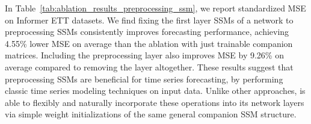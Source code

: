 In Table~\ref{tab:ablation_results_preprocessing_ssm}, we report standardized MSE on Informer ETT datasets. We find fixing the first layer SSMs of a \ourmethod{} network to preprocessing SSMs consistently improves forecasting performance, achieving 4.55\% lower MSE on average than the ablation with just trainable companion matrices. Including the preprocessing layer also improves MSE by 9.26\% on average compared to removing the layer altogether. These results suggest that preprocessing SSMs are beneficial for time series forecasting, \eg{} by performing classic time series modeling techniques on input data. Unlike other approaches, \ourmethod{} is able to flexibly and naturally incorporate these operations into its network layers via simple weight initializations of the same general companion SSM structure. 


\begin{table}[H]
    \centering
    \caption{ \textbf{Preprocessing SSM Ablation} We ablate the preprocessing SSM layer in \ourmethod{}, comparing against either replacing the SSMs with companion SSMs (Companion) or removing the layer (Removed). Including preprocessing SSMs consistently improves forecasting accuracy. }
    \label{tab:ablation_results_preprocessing_ssm}
\end{table}


